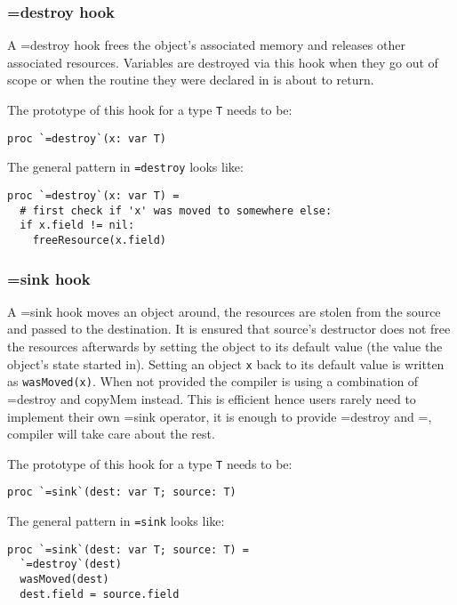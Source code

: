 \hypertarget{destroy-hook}{%
\subsubsection{\texorpdfstring{{=destroy}
hook}{=destroy hook}}\label{destroy-hook}}

A {=destroy} hook frees the object's associated memory and releases
other associated resources. Variables are destroyed via this hook when
they go out of scope or when the routine they were declared in is about
to return.

The prototype of this hook for a type \texttt{T} needs to be:

\begin{verbatim}
proc `=destroy`(x: var T)
\end{verbatim}

The general pattern in \texttt{=destroy} looks like:

\begin{verbatim}
proc `=destroy`(x: var T) =
  # first check if 'x' was moved to somewhere else:
  if x.field != nil:
    freeResource(x.field)
\end{verbatim}

\hypertarget{sink-hook}{%
\subsubsection{\texorpdfstring{{=sink}
hook}{=sink hook}}\label{sink-hook}}

A {=sink} hook moves an object around, the resources are stolen from the
source and passed to the destination. It is ensured that source's
destructor does not free the resources afterwards by setting the object
to its default value (the value the object's state started in). Setting
an object \texttt{x} back to its default value is written as
\texttt{wasMoved(x)}. When not provided the compiler is using a
combination of {=destroy} and {copyMem} instead. This is efficient hence
users rarely need to implement their own {=sink} operator, it is enough
to provide {=destroy} and {=}, compiler will take care about the rest.

The prototype of this hook for a type \texttt{T} needs to be:

\begin{verbatim}
proc `=sink`(dest: var T; source: T)
\end{verbatim}

The general pattern in \texttt{=sink} looks like:

\begin{verbatim}
proc `=sink`(dest: var T; source: T) =
  `=destroy`(dest)
  wasMoved(dest)
  dest.field = source.field
\end{verbatim}

